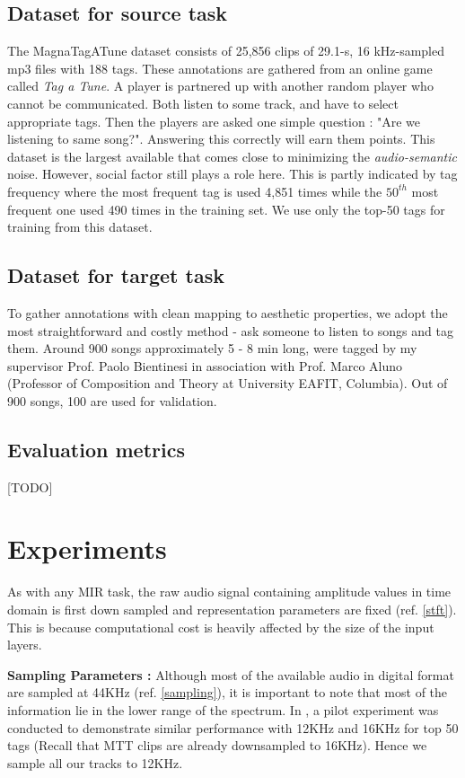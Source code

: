 \subsection{Dataset for source task}
\label{source}
The MagnaTagATune dataset consists of 25,856 clips of 29.1-s, 16 kHz-sampled mp3 files with 188 tags. These annotations are gathered from an online game called \textit{Tag a Tune}. A player is partnered up with another random player who cannot be communicated. Both listen to some track, and have to select appropriate tags. Then the players are asked one simple question : "Are we listening to same song?". Answering this correctly will earn them points. This dataset is the largest available that comes close to minimizing the \textit{audio-semantic} noise. However, social factor still plays a role here. This is partly indicated by tag frequency where the most frequent tag is used 4,851 times while the $50^{th}$ most frequent one used 490 times in the training set. We use only the top-50 tags for training from this dataset.  

\subsection{Dataset for target task}
\label{target}
To gather annotations with clean mapping to aesthetic properties, we adopt the most straightforward and costly method - ask someone to listen to songs and tag them. Around 900 songs approximately 5 - 8 min long, were tagged by my supervisor Prof. Paolo Bientinesi in association with Prof. Marco Aluno (Professor of Composition and Theory at University EAFIT, Columbia). Out of 900 songs, 100 are used for validation.  

\subsection{Evaluation metrics}
\label{evaluation}
[TODO]

\section{Experiments}
\label{experiments}
As with any MIR task, the raw audio signal containing amplitude values in time domain is first down sampled and representation parameters are fixed (ref. \ref{stft}). This is because computational cost is heavily affected by the size of the input layers.
\bigskip
 
\noindent \textbf{Sampling Parameters : } Although most of the available audio in digital format are sampled at 44KHz (ref. \ref{sampling}), it is important to note that most of the information lie in the lower range of the spectrum. In \cite{choi_cnn}, a pilot experiment was conducted to demonstrate similar performance with 12KHz and 16KHz for top 50 tags (Recall that MTT clips are already downsampled to 16KHz). Hence we sample all our tracks to 12KHz. 
\bigskip

